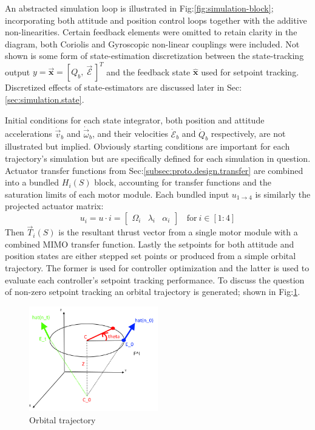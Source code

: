 \vspace{-12pt}
\par
An abstracted simulation loop is illustrated in Fig:\ref{fig:simulation-block}; incorporating both attitude and position control loops together with the additive non-linearities. Certain feedback elements were omitted to retain clarity in the diagram, both Coriolis and Gyroscopic non-linear couplings were included. Not shown is some form of state-estimation discretization between the state-tracking output $y=\vec{\mathbf{x}}=[Q_b,~\vec{\mathcal{E}}\hspace{2pt}]^T$ and the feedback state $\hat{\mathbf{x}}$ used for setpoint tracking. Discretized effects of state-estimators are discussed later in Sec:\ref{sec:simulation.state}.
\par
Initial conditions for each state integrator, both position and attitude accelerations $\dot{\vec{v}}_b$ and $\dot{\vec{\omega}}_b$, and their velocities $\dot{\mathcal{E}}_b$ and $\dot{Q}_b$ respectively, are not illustrated but implied. Obviously starting conditions are important for each trajectory's simulation but are specifically defined for each simulation in question. Actuator transfer functions from Sec:\ref{subsec:proto.design.transfer} are combined into a bundled $H_{i}(S)$ block, accounting for transfer functions and the saturation limits of each motor module. Each bundled input $u_{1\rightarrow 4}$ is similarly the projected actuator matrix:
\begin{equation}
u_{i}=u\cdot i = \begin{bmatrix}
\Omega_i & \lambda_i & \alpha_i
\end{bmatrix}~~~~\text{for}~i\in[1:4]
\end{equation}
Then $\vec{T}_i(S)$ is the resultant thrust vector from a single motor module with a combined MIMO transfer function. Lastly the setpoints for both attitude and position states are either stepped set points or produced from a simple orbital trajectory. The former is used for controller optimization and the latter is used to evaluate each controller's setpoint tracking performance. To discuss the question of non-zero setpoint tracking an orbital trajectory is generated; shown in Fig:\ref{fig:trajectory}.
\begin{figure}[htbp]
\centering
\includegraphics[width=0.5\textwidth]{figs/trajectory}
\caption{Orbital trajectory}
\label{fig:trajectory}
\vspace{-18pt}
\end{figure}

